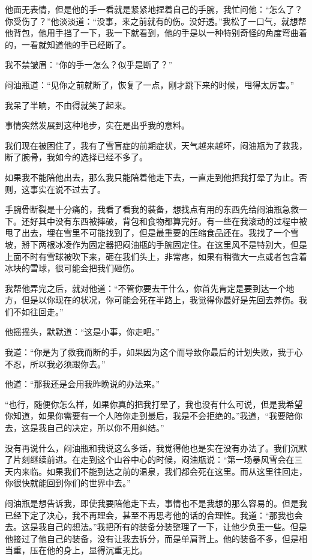他面无表情，但是他的手一看就是紧紧地捏着自己的手腕，我忙问他：“怎么了？你受伤了？”他淡淡道：“没事，来之前就有的伤。没好透。”我松了一口气，就想帮他背包，他用手挡了一下，我一下就看到，他的手是以一种特别奇怪的角度弯曲着的，一看就知道他的手已经断了。

我不禁皱眉：“你的手一怎么？似乎是断了？”

闷油瓶道：“见你之前就断了，恢复了一点，刚才跳下来的时候，甩得太厉害。”

我呆了半晌，不由得就笑了起来。

事情突然发展到这种地步，实在是出乎我的意料。

我们现在被困住了，我有了雪盲症的前期症状，天气越来越坏，闷油瓶为了救我，断了腕骨，我如今的选择已经不多了。

如果我不能陪他出去，那么我只能陪着他走下去，一直走到他把我打晕了为止。否则，这事实在说不过去了。

手腕骨断裂是十分痛的，我看了看我的装备，想找点有用的东西先给闷油瓶急救一下。还好其中没有东西被摔破，背包和食物都算完好。有一些在我滚动的过程中被甩了出去，埋在雪里不可能找到了，但是最重要的压缩食品还在。我找了一个雪坡，掰下两根冰凌作为固定器把闷油瓶的手腕固定住。在这里风不是特别大，但是上面不时有雪球被吹下来，砸在我们头上，非常疼，如果有稍微大一点或者包含着冰块的雪球，很可能会把我们砸伤。

我帮他弄完之后，就对他道：“不管你要去干什么，你首先肯定是要到达一个地方，但是以你现在的状况，你可能会死在半路上，我觉得你最好是先回去养伤。我们不如往回走。”

他摇摇头，默默道：“这是小事，你走吧。”

我道：“你是为了救我而断的手，如果因为这个而导致你最后的计划失败，我于心不忍，所以我必须跟你去。”

他道：“那我还是会用我昨晚说的办法来。”

“也行，随便你怎么样，如果你真的把我打晕了，我也没有什么可说，但是我希望你知道，如果你需要有一个人陪你走到最后，我是不会拒绝的。”我道，“我要陪你去，这是我自己的决定，所以你不用纠结。”

没有再说什么，闷油瓶和我说这么多话，我觉得他也是实在没有办法了。我们沉默了片刻继续前进。在走到这个山谷中心的时候，闷油瓶说：“第一场暴风雪会在三天内来临。如果我们不能到达之前的温泉，我们都会死在这里。而从这里往回走，你很快就能回到你们的世界中去。”

闷油瓶是想告诉我，即使我要陪他走下去，事情也不是我想的那么容易的。但是我已经下定了决心，我不再理会，甚至不再思考他的话的合理性。我道：“那我也会去。这是我自己的想法。”我把所有的装备分装整理了一下，让他少负重一些。但是他接过了他自己的装备，没有让我去拆分，而是单肩背上。他的装备不多，但是相当重，压在他的身上，显得沉重无比。

